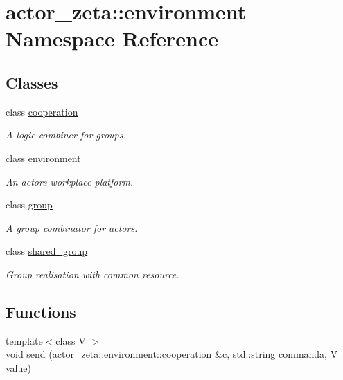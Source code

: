 \hypertarget{namespaceactor__zeta_1_1environment}{}\section{actor\+\_\+zeta\+:\+:environment Namespace Reference}
\label{namespaceactor__zeta_1_1environment}
\subsection*{Classes}
\begin{DoxyCompactItemize}
\item 
class \hyperlink{classactor__zeta_1_1environment_1_1cooperation}{cooperation}
\begin{DoxyCompactList}\small\item\em A logic combiner for groups. \end{DoxyCompactList}\item 
class \hyperlink{classactor__zeta_1_1environment_1_1environment}{environment}
\begin{DoxyCompactList}\small\item\em An actors workplace platform. \end{DoxyCompactList}\item 
class \hyperlink{classactor__zeta_1_1environment_1_1group}{group}
\begin{DoxyCompactList}\small\item\em A group combinator for actors. \end{DoxyCompactList}\item 
class \hyperlink{classactor__zeta_1_1environment_1_1shared__group}{shared\+\_\+group}
\begin{DoxyCompactList}\small\item\em Group realisation with common resource. \end{DoxyCompactList}\end{DoxyCompactItemize}
\subsection*{Functions}
\begin{DoxyCompactItemize}
\item 
{\footnotesize template$<$class V $>$ }\\void \hyperlink{namespaceactor__zeta_1_1environment_a6c3d077fd8465f07c9bccc3e0a19ba14}{send} (\hyperlink{classactor__zeta_1_1environment_1_1cooperation}{actor\+\_\+zeta\+::environment\+::cooperation} \&c, std\+::string commanda, V value)
\end{DoxyCompactItemize}


